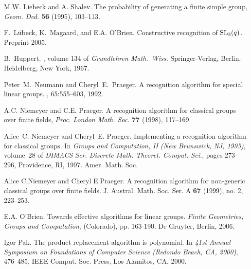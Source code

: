 \documentclass[12pt]{article}
\def\SL{{\rm SL}}
\begin{document}
\begin{thebibliography}{10}
                                                                                

 M.W. Liebeck and A. Shalev. The probability of generating
a finite simple group, {\it Geom. Ded.} {\bf 56} (1995), 103--113.

F.\ L{\"u}beck, K.\ Magaard, and E.A. O'Brien. 
Constructive recognition of $\SL_3(q)$.
Preprint 2005.

B.\ Huppert.
, volume 134 of {\em Grundlehren Math.\
  Wiss.}
\newblock Springer-Verlag, Berlin, Heidelberg, New York, 1967.

Peter~M.\ Neumann and Cheryl~E.\ Praeger.
\newblock A recognition algorithm for special linear groups.
, 65:555--603, 1992.

 A.C. Niemeyer and C.E. Praeger.
A recognition algorithm for classical groups over finite fields,
{\it Proc. London Math. Soc.} {\bf 77} (1998), 117--169.

Alice~C. Niemeyer and Cheryl~E. Praeger.
\newblock Implementing a recognition algorithm for classical groups.
\newblock In {\em Groups and Computation, II (New Brunswick, NJ, 1995)},
  volume~28 of {\em DIMACS Ser. Discrete Math. Theoret. Comput. Sci.}, pages
  273--296, Providence, RI, 1997. Amer. Math. Soc.

Alice C.Niemeyer and Cheryl E.Praeger.
A recognition algorithm for non-generic classical groups over finite fields. 
J. Austral. Math. Soc. Ser. A {\bf 67} (1999), no. 2, 223--253.

E.A. O'Brien. Towards effective algorithms for linear groups.
{\it Finite Geometries, Groups and Computation},
(Colorado), pp. 163-190. De Gruyter, Berlin, 2006.

Igor Pak. The product replacement algorithm is polynomial.
In {\it 41st Annual Symposium on Foundations of Computer Science
(Redondo Beach, CA, 2000)}, 476--485,
IEEE Comput. Soc. Press, Los Alamitos, CA, 2000.


\end{thebibliography}
\end{document}

